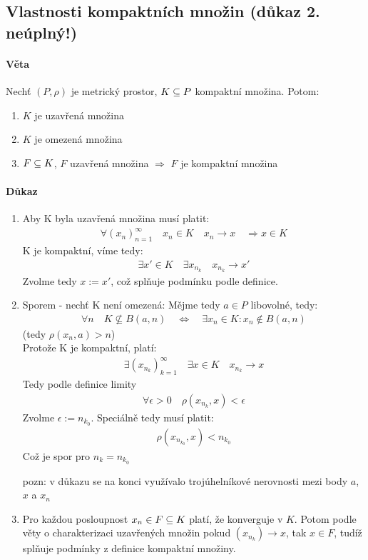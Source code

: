 \documentclass[a4paper,10pt]{article}
\begin{document}
\subsection{Vlastnosti kompaktních množin (důkaz 2. neúplný!)}
\setcounter{equation}{0}
\paragraph{Věta}
Nechť $(P, \rho)$ je metrický prostor, $K \subseteq P$ kompaktní množina. Potom:
\begin{enumerate}
	\item $K$ je uzavřená množina
	\item $K$ je omezená množina
	\item $F \subseteq K$, $F$ uzavřená množina $\Rightarrow$ $F$ je kompaktní množina
\end{enumerate}
\paragraph{Důkaz}
\begin{enumerate}
	\item Aby K byla uzavřená množina musí platit:
		\begin{align}
			\forall (x_n)_{n=1}^\infty \quad x_n \in K \quad  x_n \to x \quad
			\Rightarrow x \in K
		\end{align}
		K je kompaktní, víme tedy:
		\begin{align}
			\exists x' \in K \quad \exists x_{n_k} \quad x_{n_k} \to x'
		\end{align}
		Zvolme tedy $x:=x'$, což splňuje podmínku podle definice.
	\item Sporem - nechť K není omezená: Mějme tedy $a \in P$ libovolné, tedy:
	\begin{align}
		\forall n \quad K \nsubseteq B(a,n) \quad \Leftrightarrow \quad \exists
		x_n \in K:
		x_n \nin B(a,n)
	\end{align}
	(tedy $\rho(x_n, a) > n$) \\
	Protože K je kompaktní, platí:
	\begin{align}
		\exists (x_{n_k})_{k=1}^\infty \quad \exists x\in K \quad x_{n_k} \to x
	\end{align}
	Tedy podle definice limity 
	\begin{align}
		\forall \epsilon > 0 \quad \rho(x_{n_k}, x) < \epsilon
	\end{align}
	Zvolme $\epsilon := n_{k_0}$. Speciálně tedy musí platit:
	\begin{align}
		\rho(x_{n_{k_0}}, x) < n_{k_0}
	\end{align}
	Což je spor pro $n_k = n_{k_0}$ \par
	pozn: v důkazu se na konci využívalo trojúhelníkové nerovnosti mezi body $a$, $x$ a $x_n$
	\item Pro každou posloupnost $x_n \in F \subseteq K$ platí, že konverguje
	v $K$. Potom podle věty o charakterizaci uzavřených množin pokud $(x_{n_k})
	\to x$, tak $x \in F$, tudíž splňuje podmínky z definice kompaktní množiny.
\end{enumerate}
\end{document}
